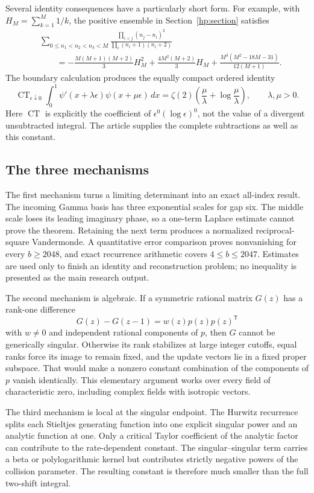 \documentclass[11pt,a4paper]{article}
\theoremstyle{definition}
\theoremstyle{remark}
\numberwithin{equation}{section}
\begin{document}
Several identity consequences have a particularly short form.
For example, with $H_M=\sum_{k=1}^M1/k$, the positive ensemble
in Section~\ref{hp:section} satisfies
\[\begin{aligned}
 &\sum_{0\le n_1<n_2<n_3<M}
 \frac{\prod_{i<j}(n_j-n_i)^2}{\prod_i(n_i+1)(n_i+2)}\\
 &\qquad=
 -\frac{M(M+1)(M+2)}3H_M^2+
 \frac{4M^2(M+2)}3H_M+
 \frac{M^3(M^2-18M-31)}{12(M+1)}.
\end{aligned}\]
The boundary calculation produces the equally compact ordered
identity
\[
 \operatorname{CT}_{\epsilon\downarrow0}
 \int_0^1\psi'(x+\lambda\epsilon)\psi(x+\mu\epsilon)\,dx
 =\zeta(2)\left(\frac\mu\lambda+\log\frac\mu\lambda\right),
 \qquad\lambda,\mu>0.
\]
Here $\operatorname{CT}$ is explicitly the coefficient of
$\epsilon^0(\log\epsilon)^0$, not the value of a divergent
unsubtracted integral. The article supplies the complete
subtractions as well as this constant.

\subsection{The three mechanisms}

The first mechanism turns a limiting determinant into an exact
all-index result. The incoming Gamma basis has three exponential
scales for gap six. The middle scale loses its leading imaginary
phase, so a one-term Laplace estimate cannot prove the theorem.
Retaining the next term produces a normalized reciprocal-square
Vandermonde. A quantitative error comparison proves nonvanishing
for every $b\ge2048$, and exact recurrence arithmetic covers
$4\le b\le2047$. Estimates are used only to finish an identity and
reconstruction problem; no inequality is presented as the main
research output.

The second mechanism is algebraic. If a symmetric rational matrix
$G(z)$ has a rank-one difference
\[
 G(z)-G(z-1)=w(z)p(z)p(z)^{\mathsf T}
\]
with $w\ne0$ and independent rational components of $p$, then
$G$ cannot be generically singular. Otherwise its rank stabilizes
at large integer cutoffs, equal ranks force its image to remain
fixed, and the update vectors lie in a fixed proper subspace.
That would make a nonzero constant combination of the components
of $p$ vanish identically. This elementary argument works over
every field of characteristic zero, including complex fields with
isotropic vectors.

The third mechanism is local at the singular endpoint. The
Hurwitz recurrence splits each Stieltjes generating function into
one explicit singular power and an analytic function at one.
Only a critical Taylor coefficient of the analytic factor can
contribute to the rate-dependent constant. The singular--singular
term carries a beta or polylogarithmic kernel but contributes
strictly negative powers of the collision parameter. The resulting
constant is therefore much smaller than the full two-shift
integral.
\end{document}
